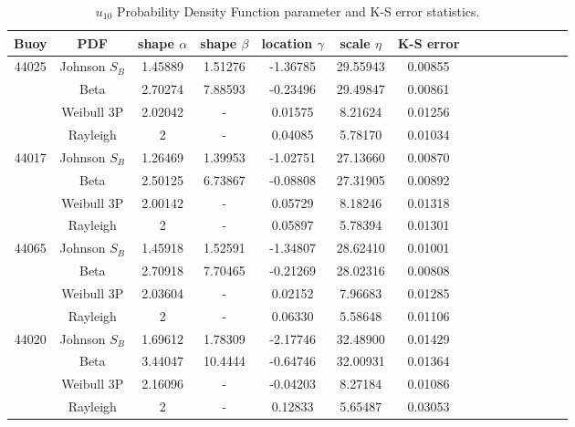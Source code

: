 \begin{table}[H]
\centering
\begin{tabular*}{0.85\textwidth}{c@{\hskip 0.25in}ccccccc @{\extracolsep{\fill}} ccccccc}
\toprule
   Buoy & PDF &  shape $\alpha$ &  shape $\beta$ &  location $\gamma$ &   scale $\eta$  & K-S error \\
\midrule
 \multirow{4}{*}{44025} &   Johnson $S_{B}$ &  1.45889 &  1.51276 &  -1.36785 &  29.55943 &    0.00855 \\
&         Beta &  2.70274 &  7.88593 &  -0.23496 &  29.49847 &    0.00861 \\
 &   Weibull 3P &  2.02042 &        - &   0.01575 &   8.21624 &    0.01256 \\
 &     Rayleigh &       2 &        - &   0.04085 &   5.78170 &    0.01034 \\ \midrule
 \multirow{4}{*}{44017} &   Johnson $S_{B}$ &  1.26469 &  1.39953 &  -1.02751 &  27.13660 &    0.00870 \\
 &         Beta &  2.50125 &  6.73867 &  -0.08808 &  27.31905 &    0.00892 \\
 &   Weibull 3P &   2.00142 &        - &   0.05729 &   8.18246 &    0.01318 \\
 &     Rayleigh &      2 &        - &   0.05897 &   5.78394 &    0.01301 \\ \midrule
\multirow{4}{*}{44065} &   Johnson $S_{B}$ &  1.45918 &  1.52591 &  -1.34807 &  28.62410 &    0.01001 \\
  &         Beta &  2.70918 &  7.70465 &  -0.21269 &  28.02316 &    0.00808 \\
  &   Weibull 3P &  2.03604	 &        - &   0.02152 &   7.96683 &    0.01285 \\
 &     Rayleigh &       2 &        - &   0.06330 &   5.58648 &    0.01106 \\ \midrule
\multirow{4}{*}{44020} &   Johnson $S_{B}$ &  1.69612 &  1.78309 &  -2.17746 &  32.48900 &    0.01429 \\
&         Beta &  3.44047 &  10.4444 &  -0.64746 &  32.00931 &    0.01364 \\
&   Weibull 3P &   2.16096 &        - &  -0.04203 &   8.27184 &    0.01086 \\
 &     Rayleigh &       2 &        - &   0.12833 &   5.65487 &    0.03053 \\
\bottomrule
\end{tabular*}
\caption {$u_{10}$ Probability Density Function parameter and K-S error statistics.}
\label{tab:wind_pdfs}
\end{table}





